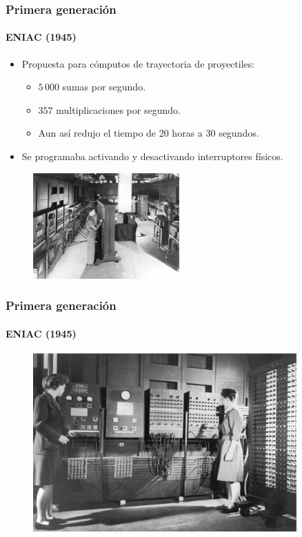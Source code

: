 \documentclass[11pt,a4paper,spanish]{beamer}
\begin{document}
\begin{frame}

\frametitle{Primera generación}
\framesubtitle{ENIAC (1945)}


    \begin{itemize}
        \item Propuesta para cómputos de trayectoria de proyectiles:
        \begin{itemize}
            \item $5\,000$ sumas por segundo.
            \item $357$ multiplicaciones por segundo.
            \item Aun así redujo el tiempo de 20 horas a 30 segundos.
        \end{itemize}
        \item Se programaba activando y desactivando interruptores físicos.
    \end{itemize}


    \begin{figure}
        \includegraphics[width=0.5\textwidth]{img/eniac.jpg}
        \captionsetup{textfont=tiny,labelformat=empty}
        \caption{}
    \end{figure}


\end{frame}

\begin{frame}

\frametitle{Primera generación}
\framesubtitle{ENIAC (1945)}

\begin{figure}
    \includegraphics[width=0.9\textwidth]{img/eniac2.jpg}
    \captionsetup{textfont=tiny,labelformat=empty}
    \caption{}
\end{figure}

\end{frame}
\end{document}
